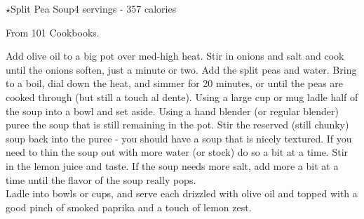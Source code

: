 \begin{recipe}{$\star$Split Pea Soup}{4 servings - 357 calories}{}

\freeform From 101 Cookbooks.


Add olive oil to a big pot over med-high heat. Stir in onions and salt and cook until the onions soften, just a minute or two. Add the split peas and water. Bring to a boil, dial down the heat, and simmer for 20 minutes, or until the peas are cooked through (but still a touch al dente). Using a large cup or mug ladle half of the soup into a bowl and set aside. Using a hand blender (or regular blender) puree the soup that is still remaining in the pot. Stir the reserved (still chunky) soup back into the puree - you should have a soup that is nicely textured. If you need to thin the soup out with more water (or stock) do so a bit at a time. Stir in the lemon juice and taste. If the soup needs more salt, add more a bit at a time until the flavor of the soup really pops.\\

Ladle into bowls or cups, and serve each drizzled with olive oil and topped with a good pinch of smoked paprika and a touch of lemon zest.
\end{recipe}